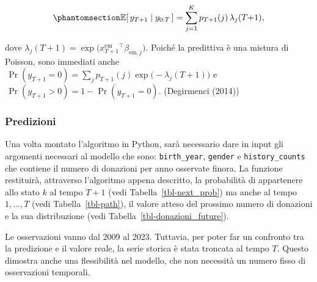 \documentclass[
  italian,
  a4paper,
  a4paper,
  twoside,
  open=right,
  12pt]{scrbook}
\theoremstyle{definition}
\theoremstyle{remark}
\begin{document}
\begin{equation}\phantomsection\label{eq-one_step_ahead_expected}{
\mathbb{E}[\,y_{T+1}\mid y_{0:T}\,]=\sum_{j=1}^K p_{T+1}(j)\,\lambda_j(T{+}1),
}\end{equation}

dove
\(\lambda_j(T{+}1)=\exp\bigl(x^{\text{em}}_{T+1}{}^\top \beta_{\text{em},j}\bigr)\).
Poiché la predittiva è una mistura di Poisson, sono immediati anche
\(\,\Pr(y_{T+1}{=}0)=\sum_j p_{T+1}(j)\exp\bigl(-\lambda_j(T{+}1)\bigr)\)
e \(\,\Pr(y_{T+1}{>}0)=1-\Pr(y_{T+1}{=}0)\). (Degirmenci (2014))

\subsubsection{Predizioni}\label{predizioni}

Una volta montato l'algoritmo in Python, sarà necessario dare in input
gli argomenti necessari al modello che sono: \texttt{birth\_year},
\texttt{gender} e \texttt{history\_counts} che contiene il numero di
donazioni per anno osservate finora. La funzione restituirà, attraverso
l'algoritmo appena descritto, la probabilità di appartenere allo stato
\(k\) al tempo \(T+1\) (vedi Tabella~\ref{tbl-next_prob}) ma anche al
tempo \(1, \dots, T\) (vedi Tabella~\ref{tbl-path}), il valore atteso
del prossimo numero di donazioni e la sua distribuzione (vedi
Tabella~\ref{tbl-donazioni_future}).

\begin{tcolorbox}[enhanced jigsaw, breakable, colframe=quarto-callout-note-color-frame, toprule=.15mm, title=\textcolor{quarto-callout-note-color}{\faInfo}\hspace{0.5em}{Nota}, arc=.35mm, colback=white, bottomrule=.15mm, bottomtitle=1mm, colbacktitle=quarto-callout-note-color!10!white, toptitle=1mm, titlerule=0mm, opacityback=0, rightrule=.15mm, opacitybacktitle=0.6, leftrule=.75mm, left=2mm, coltitle=black]

Le osservazioni vanno dal 2009 al 2023. Tuttavia, per poter far un
confronto tra la predizione e il valore reale, la serie storica è stata
troncata al tempo \(T\). Questo dimostra anche una flessibilità nel
modello, che non necessità un numero fisso di osservazioni temporali.

\end{tcolorbox}
\end{document}
